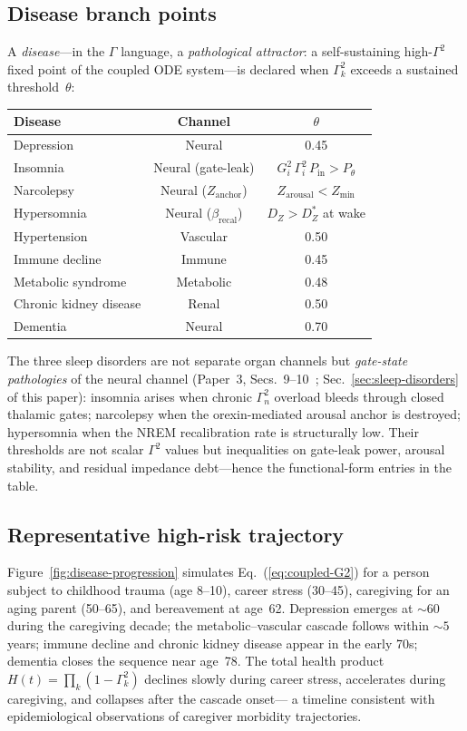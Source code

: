 \documentclass[aps,pre,twocolumn,superscriptaddress,floatfix]{revtex4-2}
\begin{document}
\subsection{Disease branch points}
\label{sec:branch-points}

A \emph{disease}---in the $\Gamma$ language,
a \emph{pathological attractor}: a self-sustaining
high-$\Gamma^2$ fixed point of the coupled ODE
system---is declared when $\Gamma_k^2$ exceeds a
sustained threshold~$\theta$:
\begin{center}
\begin{tabular}{lcc}
\toprule
Disease & Channel & $\theta$ \\
\midrule
Depression & Neural & 0.45 \\
Insomnia & Neural (gate-leak) &
  $G_i^2\,\Gamma_i^2\,P_{\text{in}}
  > P_\theta$ \\
Narcolepsy & Neural ($Z_{\text{anchor}}$) &
  $Z_{\text{arousal}} < Z_{\min}$ \\
Hypersomnia & Neural ($\beta_{\text{recal}}$) &
  $D_Z > D_Z^*$ at wake \\
Hypertension & Vascular & 0.50 \\
Immune decline & Immune & 0.45 \\
Metabolic syndrome & Metabolic & 0.48 \\
Chronic kidney disease & Renal & 0.50 \\
Dementia & Neural & 0.70 \\
\bottomrule
\end{tabular}
\end{center}

\noindent
The three sleep disorders are not separate organ
channels but \emph{gate-state pathologies} of the
neural channel
(Paper~3, Secs.~9--10~\cite{Paper3};
Sec.~\ref{sec:sleep-disorders} of this paper):
insomnia arises when chronic $\Gamma_n^2$ overload
bleeds through closed thalamic gates;
narcolepsy when the orexin-mediated arousal anchor
is destroyed;
hypersomnia when the NREM recalibration rate is
structurally low.
Their thresholds are not scalar $\Gamma^2$ values
but inequalities on gate-leak power, arousal
stability, and residual impedance debt---hence the
functional-form entries in the table.


\subsection{Representative high-risk trajectory}
\label{sec:trajectory}

Figure~\ref{fig:disease-progression} simulates
Eq.~(\ref{eq:coupled-G2}) for a person subject to
childhood trauma (age 8--10), career stress (30--45),
caregiving for an aging parent (50--65), and
bereavement at age~62.
Depression emerges at ${\sim}60$ during the caregiving
decade; the metabolic--vascular cascade follows
within ${\sim}5$ years;
immune decline and chronic kidney disease appear in
the early 70s; dementia closes the sequence near
age~78.
The total health product
$H(t) = \prod_k(1-\Gamma_k^2)$ declines
slowly during career stress, accelerates during
caregiving, and collapses after the cascade onset---
a timeline consistent with epidemiological
observations of caregiver morbidity trajectories.
\end{document}
